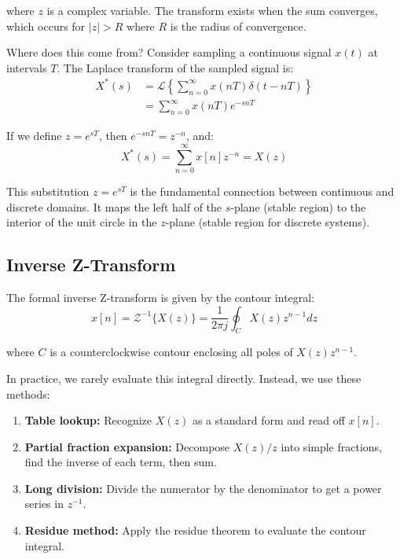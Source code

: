 where $z$ is a complex variable. The transform exists when the sum converges, which occurs for $|z| > R$ where $R$ is the radius of convergence.

Where does this come from? Consider sampling a continuous signal $x(t)$ at intervals $T$. The Laplace transform of the sampled signal is:
\begin{align}
X^*(s) &= \mathcal{L}\left\{\sum_{n=0}^{\infty} x(nT) \delta(t - nT)\right\} \\
&= \sum_{n=0}^{\infty} x(nT) e^{-snT}
\end{align}

If we define $z = e^{sT}$, then $e^{-snT} = z^{-n}$, and:
\begin{equation}
X^*(s) = \sum_{n=0}^{\infty} x[n] z^{-n} = X(z)
\end{equation}

This substitution $z = e^{sT}$ is the fundamental connection between continuous and discrete domains. It maps the left half of the $s$-plane (stable region) to the interior of the unit circle in the $z$-plane (stable region for discrete systems).

\subsection{Inverse Z-Transform}

The formal inverse Z-transform is given by the contour integral:
\begin{equation}
x[n] = \mathcal{Z}^{-1}\{X(z)\} = \frac{1}{2\pi j} \oint_C X(z) z^{n-1} dz
\end{equation}

where $C$ is a counterclockwise contour enclosing all poles of $X(z)z^{n-1}$.

In practice, we rarely evaluate this integral directly. Instead, we use these methods:

\begin{enumerate}
    \item \textbf{Table lookup:} Recognize $X(z)$ as a standard form and read off $x[n]$.

    \item \textbf{Partial fraction expansion:} Decompose $X(z)/z$ into simple fractions, find the inverse of each term, then sum.

    \item \textbf{Long division:} Divide the numerator by the denominator to get a power series in $z^{-1}$.

    \item \textbf{Residue method:} Apply the residue theorem to evaluate the contour integral.
\end{enumerate}

